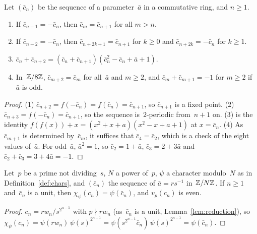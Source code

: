 \begin{lemma}
  \label{lem:orbit}
  \leanok
  Let $(\bar c_n)$ be the sequence of a parameter~$\bar a$ in a commutative ring, and $n \ge 1$.
  \begin{enumerate}
    \item If $\bar c_{n+1} = -\bar c_n$, then $\bar c_m = \bar c_{n+1}$ for all $m > n$.
    \item If $\bar c_{n+2} = -\bar c_n$, then $\bar c_{n+2k+1} = \bar c_{n+1}$ for $k \ge 0$ and
          $\bar c_{n+2k} = -\bar c_n$ for $k \ge 1$.
    \item $\bar c_n + \bar c_{n+2} = (\bar c_n + \bar c_{n+1})(\bar c_n^2 - \bar c_n + \bar a + 1)$.
    \item In~$\mathbb{Z}/8\mathbb{Z}$, $\bar c_{m+2} = \bar c_m$ for all~$\bar a$ and $m \ge 2$, and
          $\bar c_m + \bar c_{m+1} = -1$ for $m \ge 2$ if~$\bar a$ is odd.
  \end{enumerate}
\end{lemma}
\begin{proof}
  \leanok
  (1) $\bar c_{n+2} = f(-\bar c_n) = f(\bar c_n) = \bar c_{n+1}$, so $\bar c_{n+1}$ is a fixed
  point. (2) $\bar c_{n+3} = f(-\bar c_n) = \bar c_{n+1}$, so the sequence is~$2$-periodic
  from~$n+1$ on. (3) is the identity $f(f(x)) + x = (x^2 + x + a)(x^2 - x + a + 1)$ at
  $x = \bar c_n$. (4) As~$\bar c_{m+1}$ is determined by~$\bar c_m$, it suffices that
  $\bar c_4 = \bar c_2$, which is a check of the eight values of~$\bar a$. For odd~$\bar a$,
  $\bar a^2 = 1$, so $\bar c_2 = 1 + \bar a$, $\bar c_3 = 2 + 3\bar a$ and
  $\bar c_2 + \bar c_3 = 3 + 4\bar a = -1$.
\end{proof}

\begin{lemma}
  \label{lem:localeval}
  \leanok
  Let~$p$ be a prime not dividing~$s$, $N$ a power of~$p$, $\psi$ a character modulo~$N$ as in
  Definition~\ref{def:chars}, and $(\bar c_n)$ the sequence of $\bar a = r s^{-1}$ in~$\mathbb{Z}/N\mathbb{Z}$.
  If $n \ge 1$ and~$\bar c_n$ is a unit, then $\chi_\psi(c_n) = \psi(\bar c_n)$, and
  $v_p(c_n)$ is even.
\end{lemma}
\begin{proof}
  \leanok
  $c_n = r w_n / s^{2^{n-1}}$ with $p \nmid r w_n$ (as~$\bar c_n$ is a unit,
  Lemma~\ref{lem:reduction}), so $\chi_\psi(c_n) = \psi(r w_n)\,\psi(s)^{2^{n-1}} =
  \psi(s^{2^{n-1}} \bar c_n)\,\psi(s)^{2^{n-1}} = \psi(\bar c_n)$.
\end{proof}

